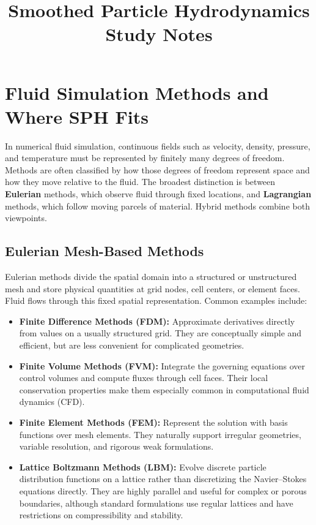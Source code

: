 \documentclass[11pt]{article}
\title{Smoothed Particle Hydrodynamics Study Notes}
\author{}
\date{}
\begin{document}
\maketitle
\tableofcontents

\section{Fluid Simulation Methods and Where SPH Fits}

In numerical fluid simulation, continuous fields such as velocity, density,
pressure, and temperature must be represented by finitely many degrees of
freedom. Methods are often classified by how those degrees of freedom represent
space and how they move relative to the fluid. The broadest distinction is
between \textbf{Eulerian} methods, which observe fluid through fixed locations,
and \textbf{Lagrangian} methods, which follow moving parcels of material.
Hybrid methods combine both viewpoints.

\subsection{Eulerian Mesh-Based Methods}

Eulerian methods divide the spatial domain into a structured or unstructured
mesh and store physical quantities at grid nodes, cell centers, or element
faces. Fluid flows through this fixed spatial representation. Common examples
include:

\begin{itemize}
    \item \textbf{Finite Difference Methods (FDM):} Approximate derivatives
    directly from values on a usually structured grid. They are conceptually
    simple and efficient, but are less convenient for complicated geometries.
    \item \textbf{Finite Volume Methods (FVM):} Integrate the governing
    equations over control volumes and compute fluxes through cell faces.
    Their local conservation properties make them especially common in
    computational fluid dynamics (CFD).
    \item \textbf{Finite Element Methods (FEM):} Represent the solution with
    basis functions over mesh elements. They naturally support irregular
    geometries, variable resolution, and rigorous weak formulations.
    \item \textbf{Lattice Boltzmann Methods (LBM):} Evolve discrete particle
    distribution functions on a lattice rather than discretizing the
    Navier--Stokes equations directly. They are highly parallel and useful for
    complex or porous boundaries, although standard formulations use regular
    lattices and have restrictions on compressibility and stability.
\end{itemize}
\end{document}
